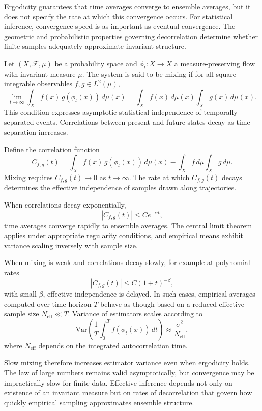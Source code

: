 \documentclass[12pt]{book}
\begin{document}
Ergodicity guarantees that time averages converge to ensemble averages, but it does not specify the rate at which this convergence occurs. For statistical inference, convergence speed is as important as eventual convergence. The geometric and probabilistic properties governing decorrelation determine whether finite samples adequately approximate invariant structure.

Let $(X,\mathcal{F},\mu)$ be a probability space and $\phi_t : X \to X$ a measure-preserving flow with invariant measure $\mu$. The system is said to be mixing if for all square-integrable observables $f,g \in L^2(\mu)$,
\[
\lim_{t \to \infty}
\int_X f(x)\, g(\phi_t(x))\, d\mu(x)
=
\int_X f(x)\, d\mu(x)
\int_X g(x)\, d\mu(x).
\]
This condition expresses asymptotic statistical independence of temporally separated events. Correlations between present and future states decay as time separation increases.

Define the correlation function
\[
C_{f,g}(t)
=
\int_X f(x)\, g(\phi_t(x))\, d\mu(x)
-
\int_X f\, d\mu
\int_X g\, d\mu.
\]
Mixing requires $C_{f,g}(t) \to 0$ as $t \to \infty$. The rate at which $C_{f,g}(t)$ decays determines the effective independence of samples drawn along trajectories.

When correlations decay exponentially,
\[
|C_{f,g}(t)| \le C e^{-\alpha t},
\]
time averages converge rapidly to ensemble averages. The central limit theorem applies under appropriate regularity conditions, and empirical means exhibit variance scaling inversely with sample size.

When mixing is weak and correlations decay slowly, for example at polynomial rates
\[
|C_{f,g}(t)| \le C (1+t)^{-\beta},
\]
with small $\beta$, effective independence is delayed. In such cases, empirical averages computed over time horizon $T$ behave as though based on a reduced effective sample size $N_{\mathrm{eff}} \ll T$. Variance of estimators scales according to
\[
\mathrm{Var}\!\left(
\frac{1}{T} \int_0^T f(\phi_t(x))\, dt
\right)
\approx
\frac{\sigma^2}{N_{\mathrm{eff}}},
\]
where $N_{\mathrm{eff}}$ depends on the integrated autocorrelation time.

Slow mixing therefore increases estimator variance even when ergodicity holds. The law of large numbers remains valid asymptotically, but convergence may be impractically slow for finite data. Effective inference depends not only on existence of an invariant measure but on rates of decorrelation that govern how quickly empirical sampling approximates ensemble structure.
\end{document}
